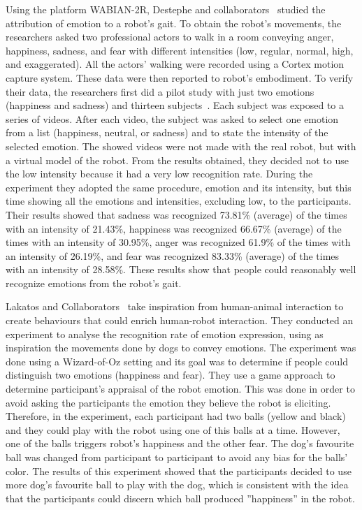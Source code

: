 Using the platform WABIAN-2R, Destephe and collaborators~\cite{Destephe2013b} studied the attribution of emotion to a robot's gait. To obtain the robot's movements, the researchers asked two professional actors to walk in a room conveying anger, happiness, sadness, and fear with different intensities (low, regular, normal, high, and exaggerated). All the actors' walking were recorded using a Cortex motion capture system. These data were then reported to robot's embodiment. To verify their data, the researchers first did a pilot study with just two emotions (happiness and sadness) and thirteen subjects~\cite{Destephe2013}. Each subject was exposed to a series of videos. After each video, the subject was asked to select one emotion from a list (happiness, neutral, or sadness) and to state the intensity of the selected emotion. The showed videos were not made with the real robot, but with a virtual model of the robot. From the results obtained, they decided not to use the low intensity because it had a very low recognition rate. During the experiment they adopted the same procedure, emotion and its intensity, but this time showing all the emotions and intensities, excluding low, to the participants. Their results showed that sadness was recognized 73.81\% (average) of the times with an intensity of 21.43\%, happiness was recognized 66.67\% (average) of the times with an intensity of 30.95\%, anger was recognized 61.9\% of the times with an intensity of 26.19\%, and fear was recognized 83.33\% (average) of the times with an intensity of 28.58\%. %
These results show that people could reasonably well recognize emotions from the robot's gait. 

Lakatos and Collaborators~\cite{Lakatos2014} take inspiration from human-animal interaction
to create behaviours that could enrich human-robot interaction. They conducted an experiment to analyse the recognition rate of emotion expression, using as inspiration the movements done by dogs to convey emotions. The experiment was done using a Wizard-of-Oz setting and its goal was to determine if people could distinguish two emotions (happiness and fear). They use a game approach to determine participant's appraisal of the robot emotion. This was done in order to avoid asking the participants the emotion they believe the robot is eliciting. Therefore, in the experiment, each participant had two balls (yellow and black) and they could play with the robot using one of this balls at a time. However, one of the balls triggers robot's happiness and the other fear. The dog's favourite ball was changed from participant to participant to avoid any bias for the balls' color. The results of this experiment showed that the participants decided to use more dog's favourite ball to play with the dog, which is consistent with the idea that the participants could discern which ball produced ''happiness'' in the robot.

